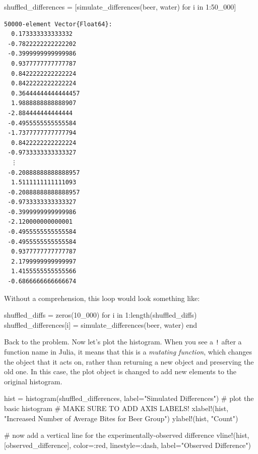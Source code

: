\documentclass[
  letterpaper,
  DIV=11,
  numbers=noendperiod]{scrartcl}
\newenvironment{Shaded}{\begin{snugshade}}{\end{snugshade}}
\newcommand{\CommentTok}[1]{\textcolor[rgb]{0.37,0.37,0.37}{#1}}
\newcommand{\ControlFlowTok}[1]{\textcolor[rgb]{0.00,0.23,0.31}{#1}}
\newcommand{\FloatTok}[1]{\textcolor[rgb]{0.68,0.00,0.00}{#1}}
\newcommand{\FunctionTok}[1]{\textcolor[rgb]{0.28,0.35,0.67}{#1}}
\newcommand{\KeywordTok}[1]{\textcolor[rgb]{0.00,0.23,0.31}{#1}}
\newcommand{\NormalTok}[1]{\textcolor[rgb]{0.00,0.23,0.31}{#1}}
\newcommand{\OperatorTok}[1]{\textcolor[rgb]{0.37,0.37,0.37}{#1}}
\newcommand{\StringTok}[1]{\textcolor[rgb]{0.13,0.47,0.30}{#1}}
\begin{document}
\begin{Shaded}
\begin{Highlighting}[]
\NormalTok{shuffled\_differences }\OperatorTok{=}\NormalTok{ [}\FunctionTok{simulate\_differences}\NormalTok{(beer, water) for i }\KeywordTok{in} \FloatTok{1}\OperatorTok{:}\FloatTok{50\_000}\NormalTok{]}
\end{Highlighting}
\end{Shaded}

\begin{verbatim}
50000-element Vector{Float64}:
  0.173333333333332
 -0.7822222222222202
 -0.3999999999999986
  0.9377777777777787
  0.8422222222222224
  0.8422222222222224
  0.36444444444444457
  1.9888888888888907
 -2.884444444444444
 -0.4955555555555584
 -1.7377777777777794
  0.8422222222222224
 -0.9733333333333327
  ⋮
 -0.20888888888888957
  1.5111111111111093
 -0.20888888888888957
 -0.9733333333333327
 -0.3999999999999986
 -2.120000000000001
 -0.4955555555555584
 -0.4955555555555584
  0.9377777777777787
  2.1799999999999997
  1.4155555555555566
 -0.6866666666666674
\end{verbatim}

Without a comprehension, this loop would look something like:

\begin{Shaded}
\begin{Highlighting}[]
\NormalTok{shuffled\_diffs }\OperatorTok{=} \FunctionTok{zeros}\NormalTok{(}\FloatTok{10\_000}\NormalTok{)}
\ControlFlowTok{for}\NormalTok{ i }\KeywordTok{in} \FloatTok{1}\OperatorTok{:}\FunctionTok{length}\NormalTok{(shuffled\_diffs)}
\NormalTok{    shuffled\_differences[i] }\OperatorTok{=} \FunctionTok{simulate\_differences}\NormalTok{(beer, water)}
\ControlFlowTok{end}
\end{Highlighting}
\end{Shaded}

Back to the problem. Now let's plot the histogram. When you see a
\texttt{!} after a function name in Julia, it means that this is a
\emph{mutating function}, which changes the object that it acts on,
rather than returning a new object and preserving the old one. In this
case, the plot object is changed to add new elements to the original
histogram.

\begin{Shaded}
\begin{Highlighting}[]
\NormalTok{hist }\OperatorTok{=} \FunctionTok{histogram}\NormalTok{(shuffled\_differences, label}\OperatorTok{=}\StringTok{"Simulated Differences"}\NormalTok{) }\CommentTok{\# plot the basic histogram}
\CommentTok{\# MAKE SURE TO ADD AXIS LABELS!}
\FunctionTok{xlabel!}\NormalTok{(hist, }\StringTok{"Increased Number of Average Bites for Beer Group"}\NormalTok{)}
\FunctionTok{ylabel!}\NormalTok{(hist, }\StringTok{"Count"}\NormalTok{)}

\CommentTok{\# now add a vertical line for the experimentally{-}observed difference}
\FunctionTok{vline!}\NormalTok{(hist, [observed\_difference], color}\OperatorTok{=:}\NormalTok{red, linestyle}\OperatorTok{=:}\NormalTok{dash, label}\OperatorTok{=}\StringTok{"Observed Difference"}\NormalTok{)}
\end{Highlighting}
\end{Shaded}
\end{document}
